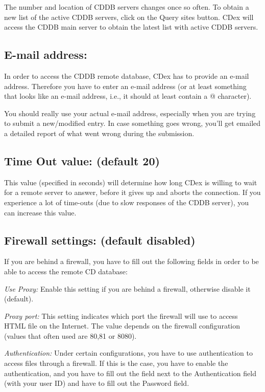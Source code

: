 The number and location of CDDB servers changes once so often. To obtain a new list of the active
CDDB servers, click on the Query sites button. CDex will access the CDDB main server to obtain the
latest list with active CDDB servers.


\subsection{E-mail address:}

In order to access the CDDB remote database, CDex has to provide an e-mail
address. Therefore you have to enter an e-mail address (or at least something that
looks like an e-mail address, i.e., it should at least contain a @ character).

You should really use your actual e-mail address, especially when
you are trying to submit a new/modified entry. In case something goes wrong, you'll
get emailed a detailed report of what went wrong during the submission.


\subsection{Time Out value: (default 20)}

This value (specified in seconds) will determine how long CDex is willing
to wait for a remote server to answer, before it gives up and aborts the
connection.
If you experience a lot of time-outs (due to slow responses of
the CDDB server), you can increase this value.


\subsection{Firewall settings: (default disabled)}

If you are behind a firewall, you have to fill out the following fields in
order to be able to access the remote CD database:

{\it Use Proxy:} Enable this setting if you are behind
a firewall, otherwise disable it (default).

{\it Proxy port:} This setting indicates which port
the firewall will use to access HTML file on the Internet. The value depends
on the firewall configuration (values that often used are 80,81 or 8080).

{\it Authentication:} Under certain configurations,
you have to use authentication to access files through a firewall.
If this is the case, you have to enable the authentication, and you
have to fill out the field next to the Authentication field (with your
user ID) and have to fill out the Password field.


